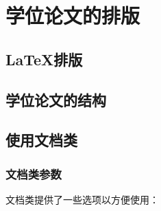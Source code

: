 
\chapter{学位论文的排版}

\section{\LaTeX 排版}


\section{学位论文的结构}


\section{使用文档类}

\subsection{文档类参数}

{\njuthesis}文档类提供了一些选项以方便使用：

